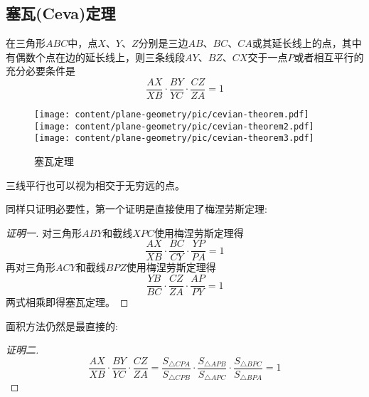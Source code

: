 \subsection{塞瓦(Ceva)定理}
\label{sec:cevian-theorem}

\begin{theorem}[塞瓦定理]
  在三角形$ABC$中，点$X$、$Y$、$Z$分别是三边$AB$、$BC$、$CA$或其延长线上的点，其中有偶数个点在边的延长线上，则三条线段$AY$、$BZ$、$CX$交于一点$P$或者相互平行的充分必要条件是
  \begin{equation}
    \label{eq:cevian-theorem}
    \frac{AX}{XB} \cdot \frac{BY}{YC} \cdot \frac{CZ}{ZA} = 1
  \end{equation}
\end{theorem}
 
\begin{figure}[htbp]
\centering
\texttt{[image: content/plane-geometry/pic/cevian-theorem.pdf]}
\texttt{[image: content/plane-geometry/pic/cevian-theorem2.pdf]}
\texttt{[image: content/plane-geometry/pic/cevian-theorem3.pdf]}
\caption{塞瓦定理}
\label{fig:cevian-theorem}
\end{figure}

三线平行也可以视为相交于无穷远的点。

同样只证明必要性，第一个证明是直接使用了梅涅劳斯定理:
\begin{proof}[证明一]
  对三角形$ABY$和截线$XPC$使用梅涅劳斯定理得
  \begin{equation*}
    \frac{AX}{XB} \cdot \frac{BC}{CY} \cdot \frac{YP}{PA} = 1
  \end{equation*}
  再对三角形$ACY$和截线$BPZ$使用梅涅劳斯定理得
  \begin{equation*}
    \frac{YB}{BC} \cdot \frac{CZ}{ZA} \cdot \frac{AP}{PY} = 1
  \end{equation*}
  两式相乘即得塞瓦定理。
\end{proof}

面积方法仍然是最直接的:
\begin{proof}[证明二]
  \begin{equation*}
    \frac{AX}{XB} \cdot \frac{BY}{YC} \cdot \frac{CZ}{ZA} =
    \frac{S_{\triangle CPA}}{S_{\triangle CPB}} \cdot
    \frac{S_{\triangle APB}}{S_{\triangle APC}} \cdot
    \frac{S_{\triangle BPC}}{S_{\triangle BPA}} = 1
  \end{equation*}
\end{proof}

